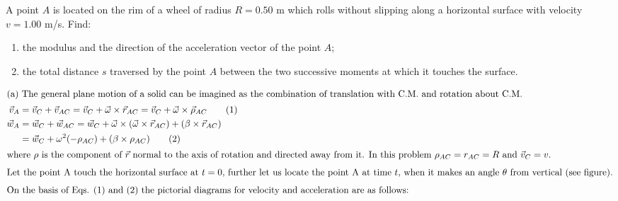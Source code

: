 
\item A point \( A \) is located on the rim of a wheel of radius \( R = 0.50 \) m which rolls without slipping along a horizontal surface with velocity \( v = 1.00 \) m/s. Find:
    \begin{enumerate}
        \item the modulus and the direction of the acceleration vector of the point \( A \);
        \item the total distance \( s \) traversed by the point \( A \) between the two successive moments at which it touches the surface.
    \end{enumerate}

\begin{solution}
    \begin{center}
    \end{center}
    
    \begin{align*}
        \intertext{(a) The general plane motion of a solid can be imagined as the combination of translation with C.M. and rotation about C.M.}
        \vec{v}_A &= \vec{v}_C + \vec{v}_{AC} = \vec{v}_C + \vec{\omega} \times \vec{r}_{AC} = \vec{v}_C + \vec{\omega} \times \vec{\rho}_{AC} \tag{1}\\
        \vec{w}_A &= \vec{w}_C + \vec{w}_{AC} = \vec{w}_C + \vec{\omega} \times (\vec{\omega} \times \vec{r}_{AC}) + (\beta \times \vec{r}_{AC})\\
        &= \vec{w}_C + \omega^2 (-\rho_{AC}) + (\beta \times \rho_{AC}) \tag{2}\\
        \intertext{where $\rho$ is the component of $\vec{r}$ normal to the axis of rotation and directed away from it. In this problem $\rho_{AC} = r_{AC} = R$ and $\vec{v}_C = v$.}
        \intertext{Let the point A touch the horizontal surface at $t=0$, further let us locate the point A at time $t$, when it makes an angle $\theta$ from vertical (see figure).}
        \intertext{On the basis of Eqs. (1) and (2) the pictorial diagrams for velocity and acceleration are as follows:}
    \end{align*}

    \begin{center}
    \end{center}
    

\end{solution}
